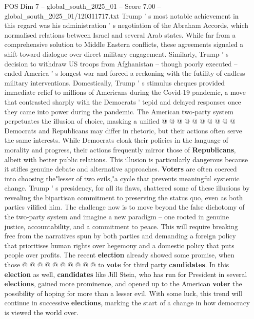 \begin{textsample}{POS Dim 7 – global\_south\_2025\_01 – Score 7.00 – global\_south\_2025\_01/120311717.txt}
Trump ' s most notable achievement in this regard was his administration ' s negotiation of the Abraham Accords, which normalised relations between Israel and several Arab states.
While far from a comprehensive solution to Middle Eastern conflicts, these agreements signaled a shift toward dialogue over direct military engagement.
Similarly, Trump ' s decision to withdraw US troops from Afghanistan -- though poorly executed -- ended America ' s longest war and forced a reckoning with the futility of endless military interventions.
Domestically, Trump ' s stimulus cheques provided immediate relief to millions of Americans during the Covid-19 pandemic, a move that contrasted sharply with the Democrats ' tepid and delayed responses once they came into power during the pandemic.
The American two-party system perpetuates the illusion of choice, masking a unified @ @ @ @ @ @ @ @ @ @ Democrats and Republicans may differ in rhetoric, but their actions often serve the same interests.
While Democrats cloak their policies in the language of morality and progress, their actions frequently mirror those of \textbf{Republicans}, albeit with better public relations.
This illusion is particularly dangerous because it stifles genuine debate and alternative approaches. \textbf{Voters} are often coerced into choosing the"lesser of two evils,"a cycle that prevents meaningful systemic change.
Trump ' s presidency, for all its flaws, shattered some of these illusions by revealing the bipartisan commitment to preserving the status quo, even as both parties vilified him.
The challenge now is to move beyond the false dichotomy of the two-party system and imagine a new paradigm -- one rooted in genuine justice, accountability, and a commitment to peace.
This will require breaking free from the narratives spun by both parties and demanding a foreign policy that prioritises human rights over hegemony and a domestic policy that puts people over profits.
The recent \textbf{election} already showed some promise, when those @ @ @ @ @ @ @ @ @ @ to \textbf{vote} for third party \textbf{candidates}.
In this \textbf{election} as well, \textbf{candidates} like Jill Stein, who has run for President in several \textbf{elections}, gained more prominence, and opened up to the American \textbf{voter} the possibility of hoping for more than a lesser evil.
With some luck, this trend will continue in successive \textbf{elections}, marking the start of a change in how democracy is viewed the world over.

\end{textsample}
